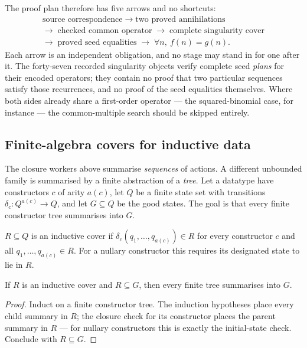 The proof plan therefore has five arrows and no shortcuts:
\[
\begin{gathered}
 \text{source correspondence}\;\longrightarrow\;
 \text{two proved annihilations}\\
 \longrightarrow\;\text{checked common operator}\;\longrightarrow\;
 \text{complete singularity cover}\\
 \longrightarrow\;\text{proved seed equalities}\;\longrightarrow\;
 \forall n,\ f(n)=g(n).
\end{gathered}
\]
Each arrow is an independent obligation, and no stage may stand in for one after
it. The forty-seven recorded singularity objects verify complete seed
\emph{plans} for their encoded operators; they contain no proof that two
particular sequences satisfy those recurrences, and no proof of the seed
equalities themselves. Where both sides already share a first-order operator ---
the squared-binomial case, for instance --- the common-multiple search should be
skipped entirely.

\subsection{Finite-algebra covers for inductive data}
\label{sec:covers}

The closure workers above summarise \emph{sequences} of actions. A different
unbounded family is summarised by a finite abstraction of a \emph{tree}. Let a
datatype have constructors $c$ of arity $a(c)$, let $Q$ be a finite state set
with transitions $\delta_c:Q^{a(c)}\to Q$, and let $G\subseteq Q$ be the good
states. The goal is that every finite constructor tree summarises into $G$.

\begin{definition}
$R\subseteq Q$ is an inductive cover if
$\delta_c(q_1,\ldots,q_{a(c)})\in R$ for every constructor $c$ and all
$q_1,\ldots,q_{a(c)}\in R$. For a nullary constructor this requires its
designated state to lie in $R$.
\end{definition}

\begin{theorem}\label{thm:finite-cover}
If $R$ is an inductive cover and $R\subseteq G$, then every finite tree
summarises into $G$.
\end{theorem}
\begin{proof}
Induct on a finite constructor tree. The induction hypotheses place every child
summary in $R$; the closure check for its constructor places the parent summary
in $R$ --- for nullary constructors this is exactly the initial-state check.
Conclude with $R\subseteq G$.
\end{proof}

